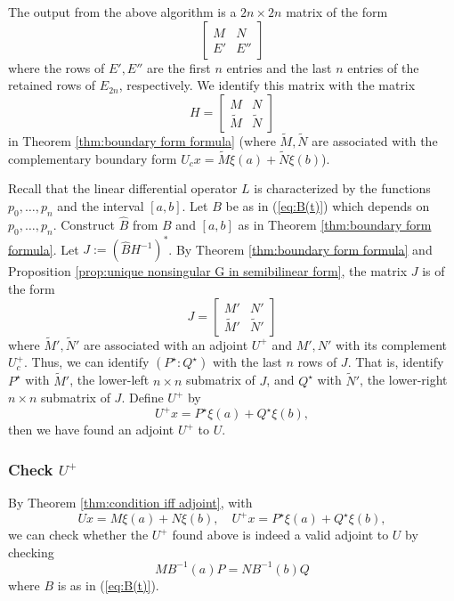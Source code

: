 \documentclass[11pt, oneside, a4paper]{article}
\begin{document}
The output from the above algorithm is a $2n\times 2n$ matrix of the form
\[\begin{bmatrix}M & N\\ E' & E''\end{bmatrix}\]
where the rows of $E', E''$ are the first $n$ entries and the last $n$ entries of the retained rows of $E_{2n}$, respectively. We identify this matrix with the matrix
\[H = \begin{bmatrix}M&N\\ \tilde{M} & \tilde{N}\end{bmatrix}\]
in Theorem \ref{thm:boundary form formula} (where $\tilde{M}, \tilde{N}$ are associated with the complementary boundary form $U_c x = \tilde{M}\xi(a) + \tilde{N}\xi(b)$).

Recall that the linear differential operator $L$ is characterized by the functions $p_0,\ldots,p_n$ and the interval $[a,b]$. Let $B$ be as in (\ref{eq:B(t)}) which depends on $p_0,\ldots,p_n$. Construct $\hat{B}$ from $B$ and $[a,b]$ as in Theorem \ref{thm:boundary form formula}. Let $J:=(\hat{B}H^{-1})^*$. By Theorem \ref{thm:boundary form formula} and Proposition \ref{prop:unique nonsingular G in semibilinear form}, the matrix $J$ is of the form
\[J=\begin{bmatrix}M' & N'\\ \tilde{M}' & \tilde{N}'\end{bmatrix}\]
where $\tilde{M}', \tilde{N}'$ are associated with an adjoint $U^+$ and $M', N'$ with its complement $U_c^+$.
Thus, we can identify $(P^\star:Q^\star)$ with the last $n$ rows of $J$. That is, identify $P^\star$ with $\tilde{M}'$, the lower-left $n\times n$ submatrix of $J$, and $Q^\star$ with $\tilde{N}'$, the lower-right $n\times n$ submatrix of $J$. Define $U^+$ by
\[U^+x = P^\star \xi(a) + Q^\star \xi(b),\]
then we have found an adjoint $U^+$ to $U$.

\subsubsection{Check $U^+$}
By Theorem \ref{thm:condition iff adjoint}, with
\[Ux = M\xi(a) + N\xi(b),\quad U^+x = P^\star \xi(a) + Q^\star \xi(b),\]
we can check whether the $U^+$ found above is indeed a valid adjoint to $U$ by checking 
\[MB^{-1}(a)P = NB^{-1}(b)Q\]
where $B$ is as in (\ref{eq:B(t)}).
\end{document}
